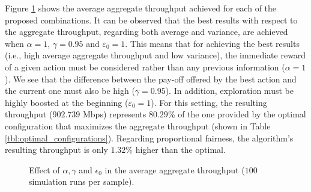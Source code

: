 \documentclass{article}
\begin{document}
	Figure \ref{fig:ql_alpha_gamma_epsilon_evaluation} shows the average aggregate throughput achieved for each of the proposed combinations. It can be observed that the best results with respect to the aggregate throughput, regarding both average and variance, are achieved when $\alpha = 1$, $\gamma = 0.95$ and $\varepsilon_0 = 1$. This means that for achieving the best results (i.e., high average aggregate throughput and low variance), the immediate reward of a given action must be considered rather than any previous information ($\alpha = 1$). We see that the difference between the pay-off offered by the best action and the current one must also be high ($\gamma = 0.95$). In addition, exploration must be highly boosted at the beginning ($\varepsilon_0=1$). For this setting, the resulting throughput ($902.739$ Mbps) represents $80.29$\% of the one provided by the optimal configuration that maximizes the aggregate throughput (shown in Table \ref{tbl:optimal_configurations}). Regarding proportional fairness, the algorithm's resulting throughput is only $1.32$\% higher than the optimal. 
	\begin{figure}[]
		\centering
		\caption{Effect of $\alpha, \gamma$ and $\epsilon_0$ in the average aggregate throughput ($100$ simulation runs per sample).}
		\label{fig:ql_alpha_gamma_epsilon_evaluation}
	\end{figure}	
	
\end{document}
